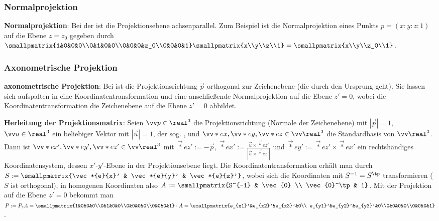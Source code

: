 \subsubsection{%
    Normalprojektion%
}

\textbf{Normalprojektion}:
Bei der  ist die Projektionsebene achsenparallel.
Zum Beispiel ist die Normalprojektion eines Punkts $p = (x:y:z:1)$ auf die Ebene $z = z_0$
gegeben durch
$\smallpmatrix{1&0&0&0\\0&1&0&0\\0&0&0&z_0\\0&0&0&1} \smallpmatrix{x\\y\\z\\1} =
\smallpmatrix{x\\y\\z_0\\1}$.

\subsubsection{%
    Axonometrische Projektion%
}

\textbf{axonometrische Projektion}:
Bei  ist die Projektionsrichtung $\vec{p}$ orthogonal
zur Zeichenebene (die durch den Ursprung geht).
Sie lassen sich aufspalten in eine Koordinatentransformation und eine anschließende
Normalprojektion auf die Ebene $z' = 0$,
wobei die Koordinatentransformation die Zeichenebene auf die Ebene $z' = 0$ abbildet.

\textbf{Herleitung der Projektionsmatrix}:
Seien $\vec{p} \in \real^3$ die Projektionsrichtung (Normale der Zeichenebene) mit $|\vec{p}| = 1$,
$\vec{u} \in \real^3$ ein beliebiger Vektor mit $|\vec{u}| = 1$, der sog. ,
und $\vec*{e}{x}, \vec*{e}{y}, \vec*{e}{z} \in \vec{\real}^3$ die Standardbasis von
$\vec{\real}^3$.
Dann ist $\vec*{e}{x}', \vec*{e}{y}', \vec*{e}{z}' \in \vec{\real}^3$
mit $\vec*{e}{z}' := -\vec{p}$,
$\vec*{e}{x}' := \frac{\vec{u} \times \vec*{e}{z}'}{|\vec{u} \times \vec*{e}{z}'|}$ und
$\vec*{e}{y}' := \vec*{e}{z}' \times \vec*{e}{x}'$
ein rechtshändiges Koordinatensystem, dessen $x'$-$y'$-Ebene in der Projektionsebene liegt.
Die Koordinatentransformation erhält man durch
$S := \smallpmatrix{\vec*{e}{x}' & \vec*{e}{y}' & \vec*{e}{z}'}$,
wobei sich die Koordinaten mit $S^{-1} = S^\tp$ transformieren ($S$ ist orthogonal),
in homogenen Koordinaten also $A := \smallpmatrix{S^{-1} & \vec{0} \\ \vec{0}^\tp & 1}$.
Mit der Projektion auf die Ebene $z' = 0$ bekommt man
$P := P_z A = \smallpmatrix{1&0&0&0\\0&1&0&0\\0&0&0&0\\0&0&0&1} \cdot A
= \smallpmatrix{e_{x1}'&e_{x2}'&e_{x3}'&0\\
e_{y1}'&e_{y2}'&e_{y3}'&0\\0&0&0&0\\0&0&0&1}$.

